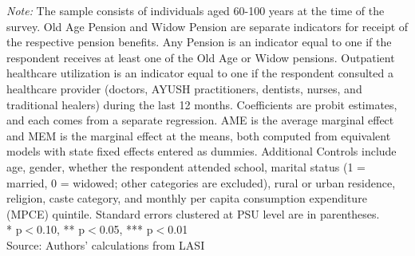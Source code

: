 \documentclass[
  11pt,
]{article}
\begin{document}
\begin{landscape}
\begin{table}[H]
{\begin{tabular}{lccccccccc}
\bottomrule
\end{tabular}
}
\vspace{2mm}
\begin{minipage}{0.95\textwidth}
\footnotesize \textit{Note:} The sample consists of individuals aged 60-100 years at the time of the survey. Old Age Pension and Widow Pension are separate indicators for receipt of the respective pension benefits. Any Pension is an indicator equal to one if the respondent receives at least one of the Old Age or Widow pensions. Outpatient healthcare utilization is an indicator equal to one if the respondent consulted a healthcare provider (doctors, AYUSH practitioners, dentists, nurses, and traditional healers) during the last 12 months. Coefficients are probit estimates, and each comes from a separate regression. AME is the average marginal effect and MEM is the marginal effect at the means, both computed from equivalent models with state fixed effects entered as dummies. Additional Controls include age, gender, whether the respondent attended school, marital status (1 = married, 0 = widowed; other categories are excluded), rural or urban residence, religion, caste category, and monthly per capita consumption expenditure (MPCE) quintile. Standard errors clustered at PSU level are in parentheses. \\ * p$<$0.10, ** p$<$0.05, *** p$<$0.01\\
Source: Authors' calculations from LASI
\end{minipage}
\end{table}
\end{landscape}
\end{document}
